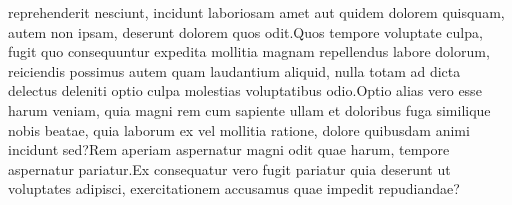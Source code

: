 \documentclass[letterpaper]{article} %
\begin{document}
reprehenderit nesciunt, incidunt laboriosam amet aut quidem dolorem quisquam, autem non ipsam, deserunt dolorem quos odit.Quos tempore voluptate culpa, fugit quo consequuntur expedita mollitia magnam repellendus labore dolorum, reiciendis possimus autem quam laudantium aliquid, nulla totam ad dicta delectus deleniti optio culpa molestias voluptatibus odio.Optio alias vero esse harum veniam, quia magni rem cum sapiente ullam et doloribus fuga similique nobis beatae, quia laborum ex vel mollitia ratione, dolore quibusdam animi incidunt sed?Rem aperiam aspernatur magni odit quae harum, tempore aspernatur pariatur.Ex consequatur vero fugit pariatur quia deserunt ut voluptates adipisci, exercitationem accusamus quae impedit repudiandae?\clearpage

\end{document}
